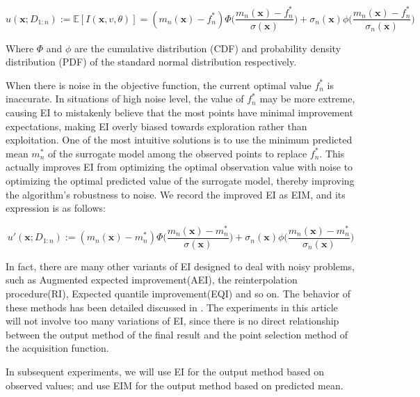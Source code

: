 \documentclass{article}
\begin{document}
\begin{equation}\label{eq7}
	u(\textbf{x};D_{1:n}):=\mathbb{E}[\textit{I}(\textbf{x},v,\theta)]=(m_n(\textbf{x})-f^*_n)\Phi \Big(\frac{m_n(\textbf{x})-f^*_n}{\sigma(\textbf{x})}\Big)+\sigma_n(\textbf{x})\phi \Big(\frac{m_n(\textbf{x})-f^*_n}{\sigma_n(\textbf{x})} \Big)
\end{equation}

Where $\Phi$ and $\phi$ are the cumulative distribution (CDF) and probability density distribution (PDF) of the standard normal distribution respectively.

\hspace{2em}When there is noise in the objective function, the current optimal value $f^*_n$ is inaccurate. In situations of high noise level, the value of $f^*_n$ may be more extreme, causing EI to mistakenly believe that the
most points have minimal improvement expectations, making EI overly biased towards exploration rather than exploitation. One of the most intuitive solutions is to use the minimum predicted mean $m^*_n$ of the surrogate model among the observed points to replace $f^*_n$. This actually improves EI from optimizing the optimal observation value with noise to optimizing the optimal predicted value of the surrogate model, thereby improving the algorithm's robustness to noise. We record the improved EI as EIM, and its expression is as follows:

\begin{equation}\label{eq8}
	u'(\textbf{x};D_{1:n}):=(m_n(\textbf{x})-m^*_n)\Phi \Big(\frac{m_n(\textbf{x})-m^*_n}{\sigma(\textbf{x})}\Big)+\sigma_n(\textbf{x})\phi \Big(\frac{m_n(\textbf{x})-m^*_n}{\sigma_n(\textbf{x})} \Big)
\end{equation}

\hspace{2em}In fact, there are many other variants of EI designed to deal with noisy problems, such as Augmented expected improvement(AEI)\citep{Huang2006Global}, the reinterpolation procedure(RI)\citep{Forrester2006Design}, Expected quantile improvement(EQI)\citep{Picheny2012Quantile} and so on. The behavior of these methods has been detailed discussed in \citep{Picheny2013benchmark}. The experiments in this article will not involve too many variations of EI, since there is no direct relationship between the output method of the final result and the point selection method of the acquisition function.

\hspace{2em}In subsequent experiments, we will use EI for the output method based on observed values; and use EIM for the output method based on predicted mean.
\end{document}
